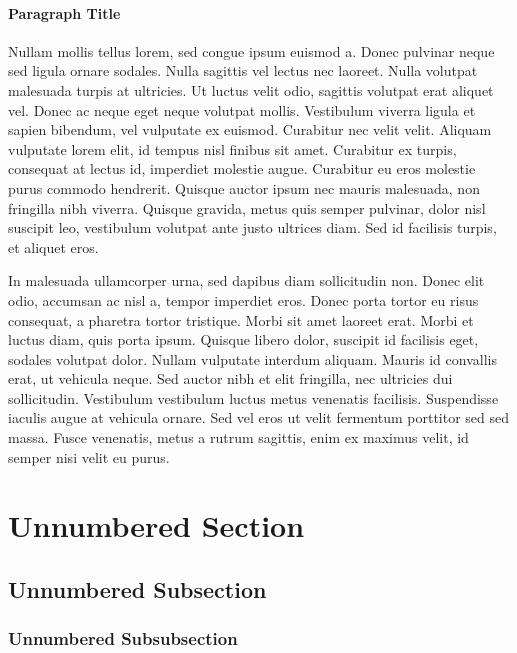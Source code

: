 \documentclass[
	11pt,
	fleqn,
	a4paper,
]{LegrandOrangeBook}
\begin{document}
\paragraph{Paragraph Title} Nullam mollis tellus lorem, sed congue ipsum euismod a. Donec pulvinar neque sed ligula ornare sodales. Nulla sagittis vel lectus nec laoreet. Nulla volutpat malesuada turpis at ultricies. Ut luctus velit odio, sagittis volutpat erat aliquet vel. Donec ac neque eget neque volutpat mollis. Vestibulum viverra ligula et sapien bibendum, vel vulputate ex euismod. Curabitur nec velit velit. Aliquam vulputate lorem elit, id tempus nisl finibus sit amet. Curabitur ex turpis, consequat at lectus id, imperdiet molestie augue. Curabitur eu eros molestie purus commodo hendrerit. Quisque auctor ipsum nec mauris malesuada, non fringilla nibh viverra. Quisque gravida, metus quis semper pulvinar, dolor nisl suscipit leo, vestibulum volutpat ante justo ultrices diam. Sed id facilisis turpis, et aliquet eros.

In malesuada ullamcorper urna, sed dapibus diam sollicitudin non. Donec elit odio, accumsan ac nisl a, tempor imperdiet eros. Donec porta tortor eu risus consequat, a pharetra tortor tristique. Morbi sit amet laoreet erat. Morbi et luctus diam, quis porta ipsum. Quisque libero dolor, suscipit id facilisis eget, sodales volutpat dolor. Nullam vulputate interdum aliquam. Mauris id convallis erat, ut vehicula neque. Sed auctor nibh et elit fringilla, nec ultricies dui sollicitudin. Vestibulum vestibulum luctus metus venenatis facilisis. Suspendisse iaculis augue at vehicula ornare. Sed vel eros ut velit fermentum porttitor sed sed massa. Fusce venenatis, metus a rutrum sagittis, enim ex maximus velit, id semper nisi velit eu purus.


\section*{Unnumbered Section}

\subsection*{Unnumbered Subsection}

\subsubsection*{Unnumbered Subsubsection}
\end{document}
